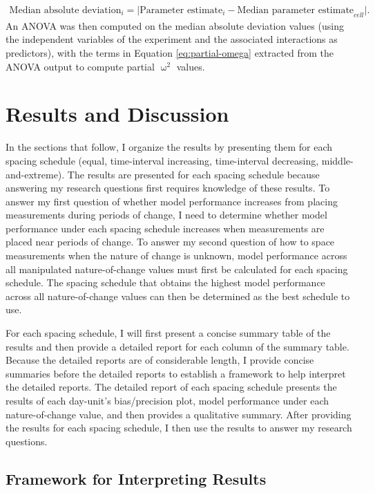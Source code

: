 \documentclass[
12pt, %
twoside,
english]{guelphthesis}
\begin{document}
\begin{align}
\text{Median absolute deviation}_i = \lvert \text{Parameter estimate}_i - \text{Median parameter estimate}_{cell} \rvert.
\label{eq:brown-forsythe}
\end{align}
\noindent An ANOVA was then computed on the median absolute deviation values (using the independent variables of the experiment and the associated interactions as predictors), with the terms in Equation \ref{eq:partial-omega} extracted from the ANOVA output to compute partial \(\upomega^2\) values.

\hypertarget{results-and-discussion}{%
\section{Results and Discussion}\label{results-and-discussion}}

In the sections that follow, I organize the results by presenting them for each spacing schedule (equal, time-interval increasing, time-interval decreasing, middle-and-extreme). The results are presented for each spacing schedule because answering my research questions first requires knowledge of these results. To answer my first question of whether model performance increases from placing measurements during periods of change, I need to determine whether model performance under each spacing schedule increases when measurements are placed near periods of change. To answer my second question of how to space measurements when the nature of change is unknown, model performance across all manipulated nature-of-change values must first be calculated for each spacing schedule. The spacing schedule that obtains the highest model performance across all nature-of-change values can then be determined as the best schedule to use.

For each spacing schedule, I will first present a concise summary table of the results and then provide a detailed report for each column of the summary table. Because the detailed reports are of considerable length, I provide concise summaries before the detailed reports to establish a framework to help interpret the detailed reports. The detailed report of each spacing schedule presents the results of each day-unit's bias/precision plot, model performance under each nature-of-change value, and then provides a qualitative summary. After providing the results for each spacing schedule, I then use the results to answer my research questions.

\hypertarget{framework-for-interpreting-results}{%
\subsection{Framework for Interpreting Results}\label{framework-for-interpreting-results}}
\end{document}
